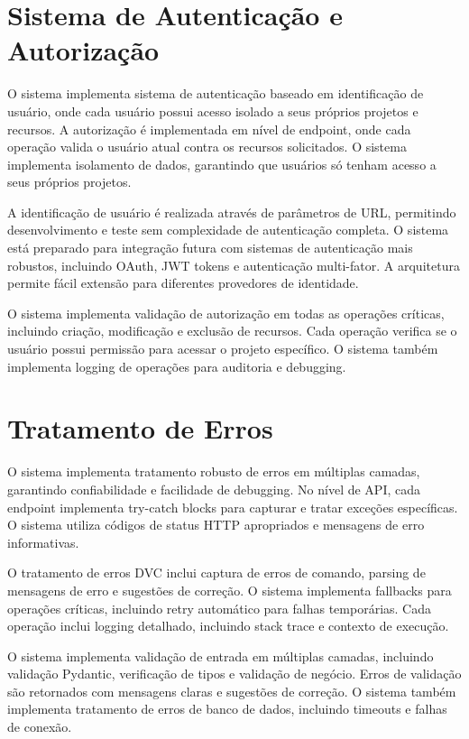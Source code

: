 \documentclass[12pt,a4paper]{article}
\begin{document}
\section{Sistema de Autenticação e Autorização}

O sistema implementa sistema de autenticação baseado em identificação de usuário, onde cada usuário possui acesso isolado a seus próprios projetos e recursos. A autorização é implementada em nível de endpoint, onde cada operação valida o usuário atual contra os recursos solicitados. O sistema implementa isolamento de dados, garantindo que usuários só tenham acesso a seus próprios projetos.

A identificação de usuário é realizada através de parâmetros de URL, permitindo desenvolvimento e teste sem complexidade de autenticação completa. O sistema está preparado para integração futura com sistemas de autenticação mais robustos, incluindo OAuth, JWT tokens e autenticação multi-fator. A arquitetura permite fácil extensão para diferentes provedores de identidade.

O sistema implementa validação de autorização em todas as operações críticas, incluindo criação, modificação e exclusão de recursos. Cada operação verifica se o usuário possui permissão para acessar o projeto específico. O sistema também implementa logging de operações para auditoria e debugging.

\section{Tratamento de Erros}

O sistema implementa tratamento robusto de erros em múltiplas camadas, garantindo confiabilidade e facilidade de debugging. No nível de API, cada endpoint implementa try-catch blocks para capturar e tratar exceções específicas. O sistema utiliza códigos de status HTTP apropriados e mensagens de erro informativas.

O tratamento de erros DVC inclui captura de erros de comando, parsing de mensagens de erro e sugestões de correção. O sistema implementa fallbacks para operações críticas, incluindo retry automático para falhas temporárias. Cada operação inclui logging detalhado, incluindo stack trace e contexto de execução.

O sistema implementa validação de entrada em múltiplas camadas, incluindo validação Pydantic, verificação de tipos e validação de negócio. Erros de validação são retornados com mensagens claras e sugestões de correção. O sistema também implementa tratamento de erros de banco de dados, incluindo timeouts e falhas de conexão.
\end{document}
